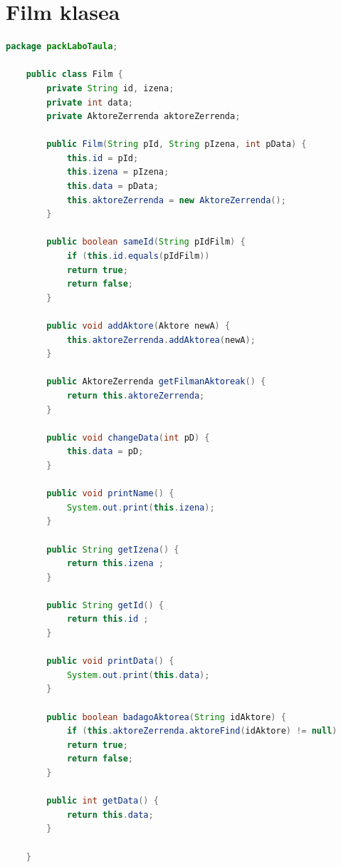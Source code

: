 \documentclass[a4paper,10pt]{report}
\begin{document}
\section{Film klasea}
\begin{lstlisting}[language=java]
	package packLaboTaula;
	
	public class Film {
		private String id, izena;
		private int data;
		private AktoreZerrenda aktoreZerrenda;
		
		public Film(String pId, String pIzena, int pData) {
			this.id = pId;
			this.izena = pIzena;
			this.data = pData;
			this.aktoreZerrenda = new AktoreZerrenda();
		}
		
		public boolean sameId(String pIdFilm) {
			if (this.id.equals(pIdFilm))
			return true;
			return false;
		}
		
		public void addAktore(Aktore newA) {
			this.aktoreZerrenda.addAktorea(newA);	
		}
		
		public AktoreZerrenda getFilmanAktoreak() {
			return this.aktoreZerrenda;
		}
		
		public void changeData(int pD) {
			this.data = pD;
		}
		
		public void printName() {
			System.out.print(this.izena);
		}
		
		public String getIzena() {
			return this.izena ;
		}
		
		public String getId() {
			return this.id ;
		}
		
		public void printData() {
			System.out.print(this.data);
		}
		
		public boolean badagoAktorea(String idAktore) {
			if (this.aktoreZerrenda.aktoreFind(idAktore) != null)
			return true;
			return false;
		}
		
		public int getData() {
			return this.data;
		}
		
	}
\end{lstlisting}
\end{document}
